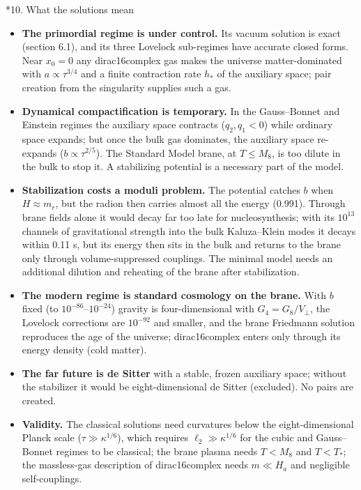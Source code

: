 \documentclass[10pt,a4paper]{article}
\makeatletter
\renewcommand\section{\@startsection{section}{1}{\z@}{-3.5ex \@plus -1ex \@minus -.2ex}{2.3ex \@plus.2ex}{\normalfont\Large\bfseries\raggedright}}
\makeatother
\begin{document}
\section*{10. What the solutions mean}
\begin{itemize}
\item \textbf{The primordial regime is under control.} Its vacuum solution is exact (section 6.1), and its three Lovelock sub-regimes have accurate closed forms. Near $x_0=0$ any dirac16complex gas makes the universe matter-dominated with $a\propto\tau^{3/4}$ and a finite contraction rate $h_*$ of the auxiliary space; pair creation from the singularity supplies such a gas.
\item \textbf{Dynamical compactification is temporary.} In the Gauss–Bonnet and Einstein regimes the auxiliary space contracts ($q_2,q_1<0$) while ordinary space expands; but once the bulk gas dominates, the auxiliary space re-expands ($b\propto\tau^{2/5}$). The Standard Model brane, at $T\le M_8$, is too dilute in the bulk to stop it. A stabilizing potential is a necessary part of the model.
\item \textbf{Stabilization costs a moduli problem.} The potential catches $b$ when $H\approx m_r$, but the radion then carries almost all the energy (0.991). Through brane fields alone it would decay far too late for nucleosynthesis; with its $10^{13}$ channels of gravitational strength into the bulk Kaluza–Klein modes it decays within 0.11 s, but its energy then sits in the bulk and returns to the brane only through volume-suppressed couplings. The minimal model needs an additional dilution and reheating of the brane after stabilization.
\item \textbf{The modern regime is standard cosmology on the brane.} With $b$ fixed (to $10^{-86}$–$10^{-24}$) gravity is four-dimensional with $G_4=G_8/V_\perp$, the Lovelock corrections are $10^{-92}$ and smaller, and the brane Friedmann solution reproduces the age of the universe; dirac16complex enters only through its energy density (cold matter).
\item \textbf{The far future is de Sitter} with a stable, frozen auxiliary space; without the stabilizer it would be eight-dimensional de Sitter (excluded). No pairs are created.
\item \textbf{Validity.} The classical solutions need curvatures below the eight-dimensional Planck scale ($\tau\gg\kappa^{1/6}$), which requires $\ell_2\gg\kappa^{1/6}$ for the cubic and Gauss–Bonnet regimes to be classical; the brane plasma needs $T<M_8$ and $T<T_*$; the massless-gas description of dirac16complex needs $m\ll H_a$ and negligible self-couplings.
\end{itemize}
\end{document}
